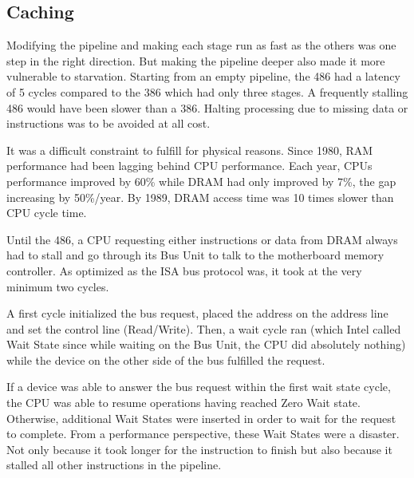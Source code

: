 \subsection{Caching }
Modifying the pipeline and making each stage run as fast as the others was one step in the right direction. But making the pipeline deeper also made it more vulnerable to starvation. Starting from an empty pipeline, the 486 had a latency of 5 cycles compared to the 386 which had only three stages. A frequently stalling 486 would have been slower than a 386. Halting processing due to missing data or instructions was to be avoided at all cost.\\
\par
It was a difficult constraint to fulfill for physical reasons. Since 1980, RAM performance had been lagging behind CPU performance. Each year, CPUs performance improved by 60\% while DRAM had only improved by 7\%, the gap increasing by 50\%/year. By 1989, DRAM access time was 10 times slower than CPU cycle time.\\
\par
\vspace{2mm}
\par
Until the 486, a CPU requesting either instructions or data from DRAM always had to stall and go through its Bus Unit to talk to the motherboard memory controller. As optimized as the ISA bus protocol was, it took at the very minimum two cycles.\\
\par 
A first cycle initialized the bus request, placed the address on the address line and set the control line (Read/Write). Then, a wait cycle ran (which Intel called Wait State since while waiting on the Bus Unit, the CPU did absolutely nothing) while the device on the other side of the bus fulfilled the request.\\
\par
{}
\par
If a device was able to answer the bus request within the first wait state cycle, the CPU was able to resume operations having reached Zero Wait state. Otherwise, additional Wait States were inserted in order to wait for the request to complete. From a performance perspective, these Wait States were a disaster. Not only because it took longer for the instruction to finish but also because it stalled all other instructions in the pipeline.\\
